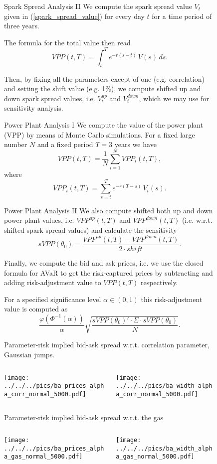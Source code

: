 \begin{figure}[htp]
Spark Spread Analysis II 
	We compute the spark spread value $V_{t}$ given in (\ref{spark_spread_value})
	for every day $t$ for a time period of three years. 

	The formula for the total value then read 
		$$VPP(t,T) = \int_{t}^{T}e^{-r(s-t)}\,V(s)\,ds.$$

	Then, by fixing all the parameters except of one (e.g. correlation)
	and setting the shift value (e.g. 1\%), we compute shifted up and
	down spark spread values, i.e. $V_{t}^{up}$ and $V_{t}^{down}$,
	which we may use for sensitivity analysis. 


Power Plant Analysis I 
	We compute the value of the power plant
	(VPP) by means of Monte Carlo simulations. For a fixed large number
	$N$ and a fixed period $T=3$ years we have 
	$$VPP(t,T) = \frac{1}{N}\sum_{i=1}^{N}VPP_i(t,T),$$ where $$VPP_i(t,T) = \sum_{s=t}^{T}e^{-r(T-s)}\,V_i(s).$$


Power Plant Analysis II 
	We also compute shifted both up and down power plant values, i.e.
	$VPP^{up}(t,T)$ and $VPP^{down}(t,T)$ (i.e. w.r.t. shifted spark
	spread values) and calculate the sensitivity 
		$$sVPP(\theta_0) = \frac{VPP^{up}(t,T) - VPP^{down}(t,T)}{2 \cdot shift}.$$

	Finally, we compute the bid and ask prices, i.e. we use the closed
	formula for AVaR to get the risk-captured prices by subtracting and
	adding risk-adjustment value to $VPP(t,T)$ respectively. 

	For a specified significance level $\alpha\in(0,1)$ this risk-adjustment
	value is computed as 
		$$\frac{\varphi(\Phi^{-1}(\alpha))}{\alpha}\sqrt{\frac{sVPP(\theta_0)' \cdot \Sigma \cdot sVPP(\theta_0) }{N}}.$$


Parameter-risk implied bid-ask spread w.r.t. correlation parameter, Gaussian jumps. 
	\begin{columns}[t]
	\begin{column}[l]{0.6\textwidth}
	\texttt{[image: ../../../pics/ba\_prices\_alpha\_corr\_normal\_5000.pdf]}
	\end{column}
	\begin{column}[r]{0.6\textwidth}
	\texttt{[image: ../../../pics/ba\_width\_alpha\_corr\_normal\_5000.pdf]}
	\end{column}
	\end{columns}

Parameter-risk implied bid-ask spread w.r.t. the gas
	\begin{columns}[t]
	\begin{column}[l]{0.6\textwidth}
	\texttt{[image: ../../../pics/ba\_prices\_alpha\_gas\_normal\_5000.pdf]}
	\end{column}
	\begin{column}[r]{0.6\textwidth}
	\texttt{[image: ../../../pics/ba\_width\_alpha\_gas\_normal\_5000.pdf]}
	\end{column}
	\end{columns}



\end{figure}
